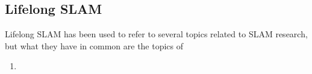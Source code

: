 \subsection{Lifelong SLAM}

Lifelong SLAM has been used to refer to several topics related to SLAM research, but what they have in common are the topics of
\begin{enumerate}
    \item 
\end{enumerate}